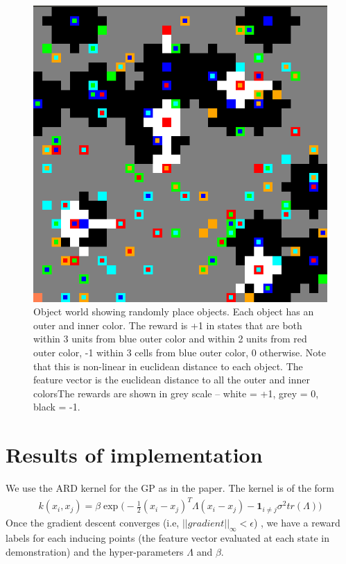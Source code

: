 \documentclass{article}[11pt]
\begin{document}
\begin{figure}[H]
  \begin{center}
    \includegraphics[width=1\linewidth]{images/32grid}
    \caption{Object world showing randomly place objects. Each object has an outer and inner color. The reward is +1 in states that are both within 3 units from blue outer color and within 2 units from red outer color, -1 within 3 cells from blue outer color, 0 otherwise. Note that this is non-linear in euclidean distance to each object. The feature vector is the euclidean distance to all the outer and inner colorsThe rewards are shown in grey scale -- white = +1, grey = 0, black = -1.}
    \label{fig:converge}
  \end{center}
\end{figure}


 
\section{Results of implementation}

We use the ARD kernel for the GP as in the paper. The kernel is of the form
\begin{align*}
k(x_i,x_j) = \beta \exp \Big (-\frac{1}{2}(x_i - x_j)^T \Lambda (x_i - x_j) - \textbf{1}_{i \neq j} \sigma^2 tr(\Lambda) \Big )
\end{align*}
 Once the gradient descent converges (i.e, $||gradient||_\infty < \epsilon$) , we have a reward labels for each inducing points (the feature vector evaluated at each state in demonstration) and the hyper-parameters $\Lambda$ and $\beta$. 
 
\end{document}
